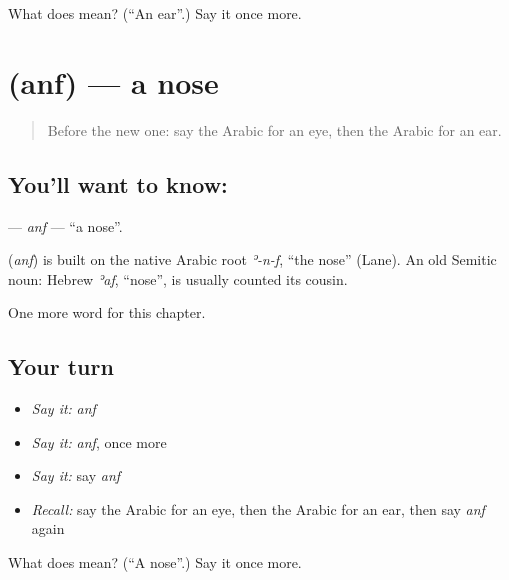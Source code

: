 \begin{tcolorbox}[breakable,colback=teal!4,colframe=teal!35!black,title={Before you move on}]
What does  mean? (\textquotedblleft{}An ear\textquotedblright{}.) Say it once more.
\end{tcolorbox}
\section[\texorpdfstring{\ar{أنف} (anf)}{أنف (anf)}]{ (anf) — a nose}

\label{lesson:AR-C50-anf}



\begin{quote}
Before the new one: say the Arabic for an eye, then the Arabic for an ear.
\end{quote}

\subsection*{You'll want to know: }
\textbf{} — \emph{anf} — \textquotedblleft{}a nose\textquotedblright{}.

\begin{cousinweb}
\textbf{} (\emph{anf}) is built on the native Arabic root \emph{ʾ-n-f}, \textquotedblleft{}the nose\textquotedblright{} (Lane). An old Semitic noun: Hebrew \emph{ʾaf}, \textquotedblleft{}nose\textquotedblright{}, is usually counted its cousin.
\end{cousinweb}

\begin{grammarlens}[title={What you've built}]
One more word for this chapter.
\end{grammarlens}

\subsection*{Your turn}
\begin{itemize}
\raggedright
  \item \emph{Say it:} \emph{anf}
  \item \emph{Say it:} \emph{anf}, once more
  \item \emph{Say it:} say \emph{anf}
  \item \emph{Recall:} say the Arabic for an eye, then the Arabic for an ear, then say \emph{anf} again
\end{itemize}

\begin{tcolorbox}[breakable,colback=teal!4,colframe=teal!35!black,title={Before you move on}]
What does  mean? (\textquotedblleft{}A nose\textquotedblright{}.) Say it once more.
\end{tcolorbox}
